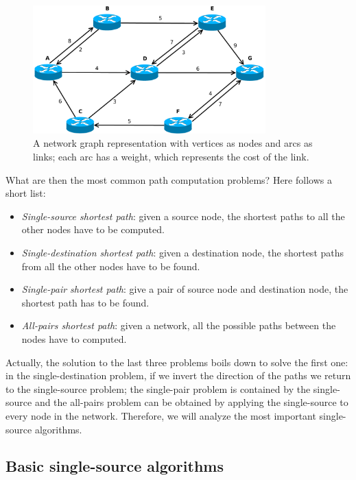 \documentclass[10pt,a4paper]{report}
\begin{document}
\begin{figure}[!hbp]
  \begin{center}
    \includegraphics[width=0.8\textwidth]{img/graph_example}
    \caption[Graph example]{A network graph representation with vertices
      as nodes and arcs as links; each arc has a weight, which
      represents the cost of the link.}
    \label{fig:graph_example}
  \end{center}
\end{figure}

What are then the most common path computation problems? Here follows
a short list:
\begin{itemize}
\item \textit{Single-source shortest path}: given a source node, the
  shortest paths to all the other nodes have to be computed.
\item \textit{Single-destination shortest path}: given a destination
  node, the shortest paths from all the other nodes have to be found.
\item \textit{Single-pair shortest path}: give a pair of source node
  and destination node, the shortest path has to be found.
\item \textit{All-pairs shortest path}: given a network, all the
  possible paths between the nodes have to computed.
\end{itemize}

Actually, the solution to the last three problems boils down to solve
the first one: in the single-destination problem, if we invert the
direction of the paths we return to the single-source problem; the
single-pair problem is contained by the single-source and the
all-pairs problem can be obtained by applying the single-source to
every node in the network. Therefore, we will analyze the most
important single-source algorithms.

\subsection{Basic single-source algorithms}
\end{document}
